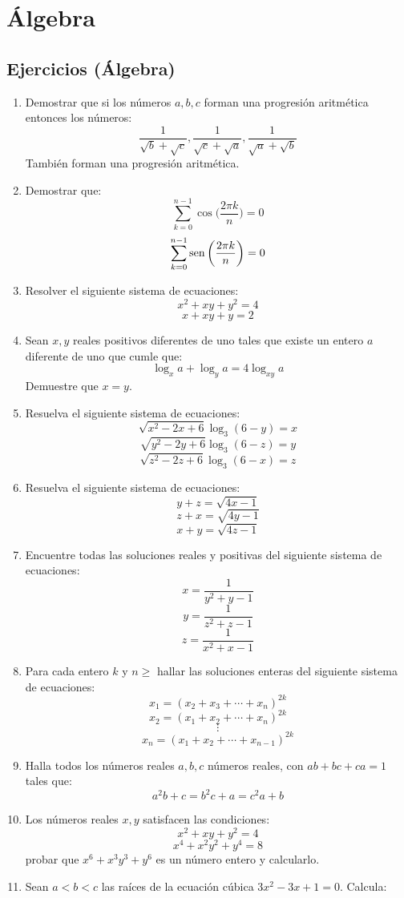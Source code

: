 \documentclass{book}
\newcommand{\sen}{\mathop{\rm sen}\nolimits} %
\begin{document}
\chapter{Álgebra}

	\section{Ejercicios (Álgebra)}
		\begin{enumerate}
			\item Demostrar que si los números $a,b,c$ forman una progresión aritmética entonces los números: 
				$$\frac{1}{\sqrt{b}+\sqrt{c}},\frac{1}{\sqrt{c}+\sqrt{a}},\frac{1}{\sqrt{a}+\sqrt{b}}$$
				También forman una progresión aritmética. 
			\item Demostrar que: 
				$$ \sum_{k=0}^{n-1}\cos{\bigg(\frac{2\pi k}{n}\bigg)}=0$$
				$$ \sum_{k=0}^{n-1}\sen{\bigg(\frac{2\pi k}{n}\bigg)}=0$$
			\item Resolver el siguiente sistema de ecuaciones: 
				$$x^2+xy+y^2=4$$
				$$x+xy+y=2$$
			\item Sean $x,y$ reales positivos diferentes de uno tales que existe un entero $a$ diferente de uno que cumle que:
				$$\log_{x}a+\log_{y}a=4\log_{xy}a$$
				Demuestre que $x=y$.
			\item Resuelva el siguiente sistema de ecuaciones: 
				$$\sqrt{x^2-2x+6}\log_{3}{(6-y)}=x$$
				$$\sqrt{y^2-2y+6}\log_{3}{(6-z)}=y$$
				$$\sqrt{z^2-2z+6}\log_{3}{(6-x)}=z$$
			\item Resuelva el siguiente sistema de ecuaciones: 
				$$y+z=\sqrt{4x-1}$$
				$$z+x=\sqrt{4y-1}$$
				$$x+y=\sqrt{4z-1}$$
			\item Encuentre todas las soluciones reales y positivas del siguiente sistema de ecuaciones: 
				$$x=\frac{1}{y^2+y-1}$$
				$$y=\frac{1}{z^2+z-1}$$
				$$z=\frac{1}{x^2+x-1}$$
			\item Para cada entero $k$ y $n\geq$  hallar las soluciones enteras del siguiente sistema de ecuaciones: 
				$$x_1={(x_2+x_3+\cdots+x_n)}^{2k}$$
				$$x_2={(x_1+x_2+\cdots+x_n)}^{2k}$$
				$$\vdots$$
				$$x_n={(x_1+x_2+\cdots+x_{n-1})}^{2k}$$
			\item Halla todos los números reales $a,b,c$ números reales, con $ab+bc+ca=1$ tales que: 
				$$a^2b+c=b^2c+a=c^2a+b$$
			\item Los números reales $x,y$ satisfacen las condiciones: 
				$$x^2+xy+y^2=4$$
				$$x^4+x^2y^2+y^4=8$$
				probar que $x^6 + x^3y^3 + y^6$ es un número entero y calcularlo. 
			\item Sean $a < b < c$ las raíces de la ecuación cúbica $3x^2-3x+1=0$. Calcula: 

\end{enumerate}
\end{document}
